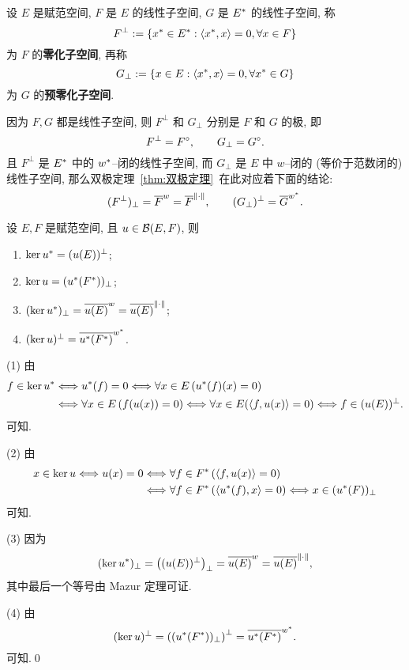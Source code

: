 	\begin{Definition}\label{def:零化子空间}
		设 $ E $ 是赋范空间, $ F $ 是 $ E $ 的线性子空间, $ G $ 是 $ E^{*} $ 的线性子空间, 称
		\[
			F^{\bot}:=\{ x^{*}\in E^{*}:\left\langle x^{*}, x \right\rangle=0, \forall x\in F \}
		\]	
		为 $ F $ 的\textbf{零化子空间}, 再称
		\[
			G_{\bot}:=\{ x\in E:\left\langle x^{*}, x \right\rangle=0, \forall x^{*}\in G \}
		\]
		为 $ G $ 的\textbf{预零化子空间}.
	\end{Definition}

	\begin{Remark}
		因为 $ F, G $ 都是线性子空间, 则 $ F^{\bot} $ 和 $ G_{\bot} $ 分别是 $ F $ 和 $ G $ 的极, 即
		\[
			F^{\bot}=F^{\circ},\qquad G_{\bot}=G^{\circ}.
		\]
		且 $ F^{\bot} $ 是 $ E^{*} $ 中的 $ w^{*} $--闭的线性子空间, 而 $ G_{\bot} $ 是 $ E $ 中 $ w $--闭的 (等价于范数闭的) 线性子空间, 那么双极定理~\ref{thm:双极定理}~在此对应着下面的结论:
		\[
			(F^{\bot})_{\bot}=\overline{F}^{w}=\overline{F}^{\left\| \cdot \right\|}, \qquad (G_{\bot})^{\bot}=\overline{G}^{w^{*}}.
		\]
	\end{Remark}

	\begin{Theorem}
		设 $ E, F $ 是赋范空间, 且 $ u\in\mathcal{B}(E, F) $, 则
		\begin{enumerate}[(1)]
			\item $ \ker u^{*}=(u(E))^{\bot} $;
			\item $ \ker u=(u^{*}(F^{*}))_{\bot} $;
			\item $ (\ker u^{*})_{\bot}=\overline{u(E)}^{w}=\overline{u(E)}^{\left\| \cdot \right\|} $;
			\item $ (\ker u)^{\bot}=\overline{u^{*}(F^{*})}^{w^{*}} $.
		\end{enumerate}
	\end{Theorem}
	\begin{Proof}
		(1) 由
		\[
			\begin{aligned}
				f\in\ker u^{*} & \Longleftrightarrow u^{*}(f)=0 \Longleftrightarrow \forall x\in E\,(u^{*}(f)(x)=0)\\
				& \Longleftrightarrow \forall x\in E\,(f(u(x))=0) \Longleftrightarrow \forall x\in E(\left\langle f, u(x) \right\rangle=0)\Longleftrightarrow f\in(u(E))^{\bot}.
			\end{aligned}
		\]
		可知.

		(2) 由
		\[
			\begin{aligned}
				x\in\ker u\Longleftrightarrow u(x)=0 &  \Longleftrightarrow \forall f\in F^{*}\,(\left\langle f, u(x) \right\rangle=0)\\
				& \Longleftrightarrow \forall f\in F^{*}\,(\left\langle u^{*}(f), x \right\rangle=0)\Longleftrightarrow x\in(u^{*}(F))_{\bot}
			\end{aligned}
		\]
		可知.

		(3) 因为
		\[
			(\ker u^{*})_{\bot}=\left( (u(E))^{\bot} \right)_{\bot}=\overline{u(E)}^{w}=\overline{u(E)}^{\left\| \cdot \right\|},
		\]
		其中最后一个等号由 Mazur 定理可证.

		(4) 由
		\[
			(\ker u)^{\bot}=\left( (u^{*}(F^{*}))_{\bot} \right)^{\bot}=\overline{u^{*}(F^{*})}^{w^{*}}.
		\]
		可知.\qed
	\end{Proof}

